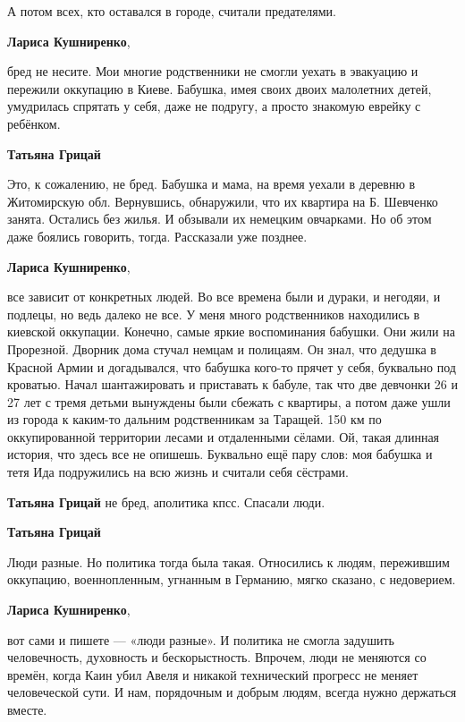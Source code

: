 \begin{itemize}
А потом всех, кто оставался в городе, считали предателями.

\begin{itemize} %
\textbf{Лариса Кушниренко}, 

бред не несите. Мои многие родственники не смогли уехать в эвакуацию и пережили
оккупацию в Киеве. Бабушка, имея своих двоих малолетних детей, умудрилась
спрятать у себя, даже не подругу, а просто знакомую еврейку с ребёнком.

\begin{itemize} %
\textbf{Татьяна Грицай} 

Это, к сожалению, не бред. Бабушка и мама, на время уехали в деревню в
Житомирскую обл. Вернувшись, обнаружили, что их квартира на Б. Шевченко занята.
Остались без жилья. И обзывали их немецким овчарками. Но об этом даже боялись
говорить, тогда. Рассказали уже позднее.


\textbf{Лариса Кушниренко}, 

все зависит от конкретных людей. Во все времена были и дураки, и негодяи, и
подлецы, но ведь далеко не все. У меня много родственников находились в
киевской оккупации. Конечно, самые яркие воспоминания бабушки. Они жили на
Прорезной. Дворник дома стучал немцам и полицаям. Он знал, что дедушка в
Красной Армии и догадывался, что бабушка кого-то прячет у себя, буквально под
кроватью. Начал шантажировать и приставать к бабуле, так что две девчонки 26 и
27 лет с тремя детьми вынуждены были сбежать с квартиры, а потом даже ушли из
города к каким-то дальним родственникам за Таращей. 150 км по оккупированной
территории лесами и отдаленными сёлами. Ой, такая длинная история, что здесь
все не опишешь. Буквально ещё пару слов: моя бабушка и тетя Ида подружились на
всю жизнь и считали себя сёстрами.


\textbf{Татьяна Грицай} не бред, аполитика кпсс. Спасали люди.

\textbf{Татьяна Грицай} 

Люди разные. Но политика тогда была такая. Относились к людям, пережившим
оккупацию, военнопленным, угнанным в Германию, мягко сказано, с недоверием.


\textbf{Лариса Кушниренко}, 

вот сами и пишете — «люди разные». И политика не смогла задушить человечность,
духовность и бескорыстность. Впрочем, люди не меняются со времён, когда Каин
убил Авеля и никакой технический прогресс не меняет человеческой сути. И нам,
порядочным и добрым людям, всегда нужно держаться вместе.


\end{itemize}
\end{itemize}
\end{itemize}
